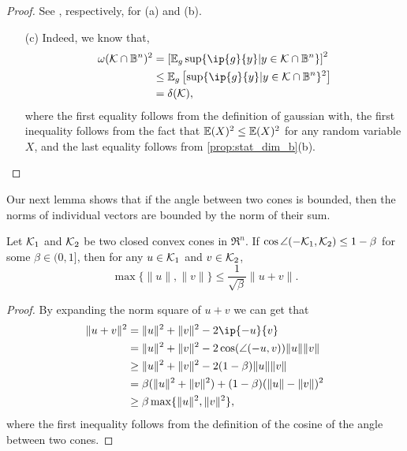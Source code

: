 \begin{proof} 
    See \cite[Proposition~3.1(6) and Proposition~3.1(5)]{amelunxen2014living}, respectively, for (a) and (b). 
    \begin{itemize}
      \item[(c)] Indeed, we know that,
      \begin{align*}
        \omega(\Kscr\cap\mB^n)^2 &= \left[\mE_{g} \sup\{ \ip{g}{y} | y\in \Kscr\cap\mB^n\}\right]^2
        \\&\leq \mE_{g} \left[\sup\{ \ip{g}{y} | y\in \Kscr\cap\mB^n\}^2\right]
        \\&= \delta(\Kscr),
      \end{align*}
      where the first equality follows from the definition of gaussian with, the first inequality follows from the fact that $\mathbb{E}(X)^2 \leq \mathbb{E}(X)^2$ for any random variable $X$, and the last equality follows from \autoref{prop:stat_dim_b}(b). 
    \end{itemize}
\end{proof}

Our next lemma shows that if the angle between two cones is bounded, then the norms of individual vectors are bounded by the norm of their sum.

\begin{lemma}\label{lemma:bound_norm}
    Let $\mathcal{K}_1$ and $\mathcal{K}_2$ be two closed convex cones in $\Re^n$. If $\cos\angle(-\mathcal{K}_1, \mathcal{K}_2) \leq 1 - \beta$ for some $\beta \in (0, 1]$, then for any $u \in \mathcal{K}_1$ and $v \in \mathcal{K}_2$, 
    \[\max\{\|u\|, \|v\|\} \leq \frac{1}{\sqrt{\beta}}\|u + v\|.\]
\end{lemma}

\begin{proof}
    By expanding the norm square of $u + v$ we can get that 
      \begin{align*}
        \|u + v\|^2 &= \|u\|^2 + \|v\|^2 - 2\ip{-u}{v}
        \\&= \|u\|^2 + \|v\|^2 - 2\cos(\angle(-u, v))\|u\|\|v\|
        \\&\geq \|u\|^2 + \|v\|^2 - 2(1-\beta)\|u\|\|v\|
        \\&= \beta(\|u\|^2 + \|v\|^2) + (1-\beta)(\|u\| - \|v\|)^2
        \\&\geq \beta\max\{\|u\|^2, \|v\|^2\},
      \end{align*}
    where the first inequality follows from the definition of the cosine of the angle between two cones. 
\end{proof}

